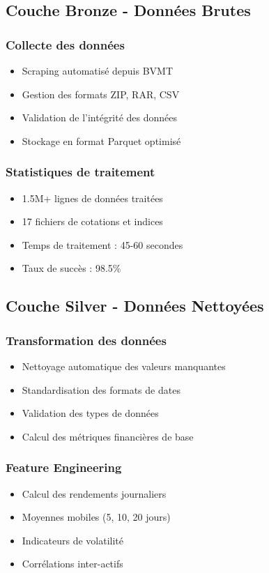 \documentclass[12pt,a4paper]{article}
\begin{document}
\subsection{Couche Bronze - Données Brutes}
\subsubsection{Collecte des données}
\begin{itemize}
    \item Scraping automatisé depuis BVMT
    \item Gestion des formats ZIP, RAR, CSV
    \item Validation de l'intégrité des données
    \item Stockage en format Parquet optimisé
\end{itemize}

\subsubsection{Statistiques de traitement}
\begin{itemize}
    \item 1.5M+ lignes de données traitées
    \item 17 fichiers de cotations et indices
    \item Temps de traitement : 45-60 secondes
    \item Taux de succès : 98.5\%
\end{itemize}

\subsection{Couche Silver - Données Nettoyées}
\subsubsection{Transformation des données}
\begin{itemize}
    \item Nettoyage automatique des valeurs manquantes
    \item Standardisation des formats de dates
    \item Validation des types de données
    \item Calcul des métriques financières de base
\end{itemize}

\subsubsection{Feature Engineering}
\begin{itemize}
    \item Calcul des rendements journaliers
    \item Moyennes mobiles (5, 10, 20 jours)
    \item Indicateurs de volatilité
    \item Corrélations inter-actifs
\end{itemize}
\end{document}
